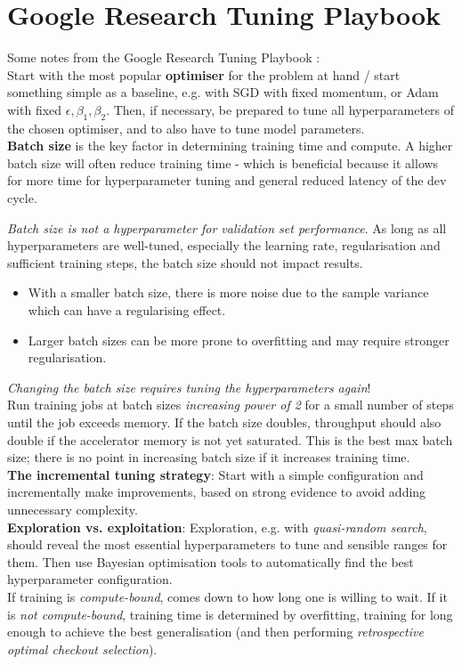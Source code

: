 \section{Google Research Tuning Playbook}

Some notes from the Google Research Tuning Playbook \citep{tuningplaybookgithub}: \\

Start with the most popular \textbf{optimiser} for the problem at hand / start something simple as a baseline,
e.g. with SGD with fixed momentum, or Adam with fixed $\epsilon, \beta_1, \beta_2$.
Then, if necessary, be prepared to tune all hyperparameters of the chosen optimiser, and to also have to tune model parameters. \\

\textbf{Batch size} is the key factor in determining training time and compute.
A higher batch size will often reduce training time - which is beneficial because it allows for
more time for hyperparameter tuning and general reduced latency of the dev cycle.

\textit{Batch size is not a hyperparameter for validation set performance}.
As long as all hyperparameters are well-tuned, especially the learning rate, regularisation and sufficient training steps, the batch size should not impact results.

\begin{itemize}
    \item With a smaller batch size, there is more noise due to the sample variance which can have a regularising effect.
    \item Larger batch sizes can be more prone to overfitting and may require stronger regularisation.
\end{itemize}

\textit{Changing the batch size requires tuning the hyperparameters again}! \\

Run training jobs at batch sizes \textit{increasing power of 2} for a small number of steps until the job exceeds memory.
If the batch size doubles, throughput should also double if the accelerator memory is not yet saturated.
This is the best max batch size; there is no point in increasing batch size if it increases training time. \\

\textbf{The incremental tuning strategy}:
Start with a simple configuration and incrementally make improvements, based on strong evidence to avoid adding unnecessary complexity. \\

\textbf{Exploration vs. exploitation}:
Exploration, e.g. with \textit{quasi-random search}, should reveal the most essential hyperparameters to tune and sensible ranges for them.
Then use Bayesian optimisation tools to automatically find the best hyperparameter configuration. \\

If training is \textit{compute-bound},  comes down to how long one is willing to wait.
If it is \textit{not compute-bound}, training time is determined by overfitting, training for long enough to achieve the best generalisation (and then performing \textit{retrospective optimal checkout selection}).
